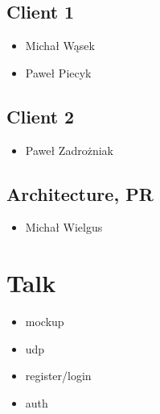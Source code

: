 \documentclass[a4paper]{article}
\begin{document}
\subsection{Client 1}
\begin{itemize}
\item Michał Wąsek
\item Paweł Piecyk
\end{itemize}
\subsection{Client 2}
\begin{itemize}
\item Paweł Zadrożniak
\end{itemize}
\subsection{Architecture, PR}
\begin{itemize}
\item Michał Wielgus
\end{itemize}
\section{Talk}
\begin{itemize}
\item mockup
\item udp
\item register/login
\item auth
\end{itemize}
\end{document}
